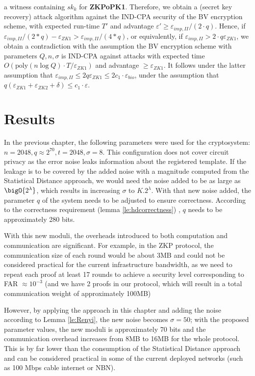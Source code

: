 a witness containing $sk_k$ for \textbf{ZKPoPK1}. Therefore, we obtain a (secret
key recovery) attack algorithm against the IND-CPA security of the BV encryption
scheme, with expected run-time $T'$ and advantage
$\varepsilon' \geq \varepsilon_{imp,II}/(2 \cdot q)$. Hence, if
$\varepsilon_{imp,II}/(2*q) - \varepsilon_{ZK1} > \varepsilon_{imp,II}/(4*q)$,
or equivalently, if $\varepsilon_{imp,II} > 2 \cdot q \varepsilon_{ZK1}$, we
obtain a contradiction with the assumption the BV encryption scheme with
parameters $Q,n,\sigma$ is IND-CPA against attacks with expected time
$O(\mathrm{poly}(n \log Q) \cdot T / \varepsilon_{ZK1})$ and advantage
$\geq \varepsilon_{ZK1}$. It follows under the latter assumption that
$\varepsilon_{imp,II} \leq 2q \varepsilon_{ZK1} \leq 2 c_1 \cdot
\varepsilon_{bio}$, under the assumption that
$q(\varepsilon_{ZK1}+\varepsilon_{ZK2} + \delta) \leq c_1 \cdot \varepsilon$.

\section{Results}
\label{sec:secProcResult}
In the previous chapter, the following parameters were used for the cryptosystem:
$n = 2048, q \approx 2^{70}, t = 2048, \sigma = 8$. This configuration does
not cover circuit privacy as the error noise leaks information about the
registered template. If the leakage is to be covered by the added noise with a
magnitude computed from the Statistical Distance approach, we would need the noise
added to be as large as $\bigO{2^{\lambda}}$, which results in increasing
$\sigma$ to $K.2^{\lambda}$. With that new noise added, the parameter $q$ of the
system needs to be adjusted to ensure correctness. According to the correctness
requirement (lemma \ref{le:hdcorrectness}) , $q$ needs to be approximately 280
bits.

With this new moduli, the overheads introduced to both computation and
communication are significant. For example, in the ZKP protocol, the
communication size of each round would be about 3MB and could not be considered
practical for the current infrastructure bandwidth, as we need to repeat each
proof at least 17 rounds to achieve a security level corresponding to FAR $\approx 10^{-3}$ (and we have 2 proofs in our protocol, which will
result in a total communication weight of approximately 100MB)

However, by applying the approach in this chapter and adding the noise according
to Lemma \ref{le:Renyi}, the new noise becomes $\sigma = 50$; with the
proposed parameter values, the new moduli is approximately 70 bits and the
communication overhead increases from 8MB to 16MB for the whole protocol. This is
by far lower than the consumption of the Statistical Distance approach and can be considered practical
in some of the current deployed networks (such as 100 Mbps cable internet or
NBN).

